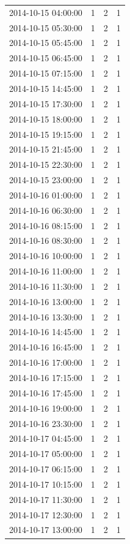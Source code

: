 \begin{tabular}{lrrr}
2014-10-15 04:00:00 & 1 & 2 & 1 \\
2014-10-15 05:30:00 & 1 & 2 & 1 \\
2014-10-15 05:45:00 & 1 & 2 & 1 \\
2014-10-15 06:45:00 & 1 & 2 & 1 \\
2014-10-15 07:15:00 & 1 & 2 & 1 \\
2014-10-15 14:45:00 & 1 & 2 & 1 \\
2014-10-15 17:30:00 & 1 & 2 & 1 \\
2014-10-15 18:00:00 & 1 & 2 & 1 \\
2014-10-15 19:15:00 & 1 & 2 & 1 \\
2014-10-15 21:45:00 & 1 & 2 & 1 \\
2014-10-15 22:30:00 & 1 & 2 & 1 \\
2014-10-15 23:00:00 & 1 & 2 & 1 \\
2014-10-16 01:00:00 & 1 & 2 & 1 \\
2014-10-16 06:30:00 & 1 & 2 & 1 \\
2014-10-16 08:15:00 & 1 & 2 & 1 \\
2014-10-16 08:30:00 & 1 & 2 & 1 \\
2014-10-16 10:00:00 & 1 & 2 & 1 \\
2014-10-16 11:00:00 & 1 & 2 & 1 \\
2014-10-16 11:30:00 & 1 & 2 & 1 \\
2014-10-16 13:00:00 & 1 & 2 & 1 \\
2014-10-16 13:30:00 & 1 & 2 & 1 \\
2014-10-16 14:45:00 & 1 & 2 & 1 \\
2014-10-16 16:45:00 & 1 & 2 & 1 \\
2014-10-16 17:00:00 & 1 & 2 & 1 \\
2014-10-16 17:15:00 & 1 & 2 & 1 \\
2014-10-16 17:45:00 & 1 & 2 & 1 \\
2014-10-16 19:00:00 & 1 & 2 & 1 \\
2014-10-16 23:30:00 & 1 & 2 & 1 \\
2014-10-17 04:45:00 & 1 & 2 & 1 \\
2014-10-17 05:00:00 & 1 & 2 & 1 \\
2014-10-17 06:15:00 & 1 & 2 & 1 \\
2014-10-17 10:15:00 & 1 & 2 & 1 \\
2014-10-17 11:30:00 & 1 & 2 & 1 \\
2014-10-17 12:30:00 & 1 & 2 & 1 \\
2014-10-17 13:00:00 & 1 & 2 & 1 \\

\end{tabular}
